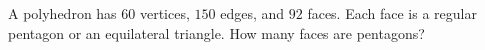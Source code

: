 A polyhedron has $60$ vertices, $150$ edges, and $92$ faces. Each face is a regular pentagon or an equilateral triangle. How many faces are pentagons?
